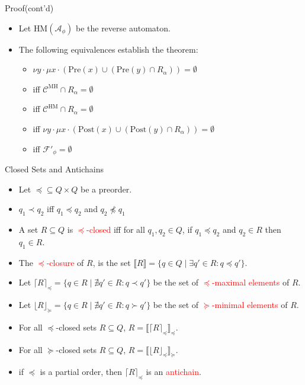 \documentclass[12pt]{beamer}
\begin{document}
\begin{frame}{Proof(cont'd)}
	\begin{itemize}
		\item Let $\text{HM}(\mathcal{A}_{\phi})$ be the reverse automaton.
		\item The following equivalences establish the theorem:
		\begin{itemize}
				\item $\nu y \cdot \mu x \cdot (\text{Pre}(x) \cup (\text{Pre}(y) \cap R_{\alpha})) = \emptyset$
				\item iff $\mathcal{C}^{\text{MH}} \cap R_{\alpha} = \emptyset$
				\item iff $\mathcal{C}^{\text{HM}} \cap R_{\alpha} = \emptyset$
				\item iff $\nu y \cdot \mu x \cdot (\text{Post}(x) \cup (\text{Post}(y) \cap R_{\alpha})) = \emptyset$
				\item iff $\mathcal{F}'_{\phi} = \emptyset$
		\end{itemize}
	\end{itemize}
\end{frame}

\begin{frame}{Closed Sets and Antichains}
	\begin{itemize}
		\item Let $\preceq \subseteq Q \times Q$ be a preorder.
		\item $q_{1} \prec q_{2}$ iff $q_{1} \preceq q_{2}$ and $q_{2} \npreceq q_{1}$
		\item A set $R \subseteq Q$ is \textcolor{red}{$\preceq$-closed} iff for all $q_{1}, q_{2} \in Q$, if $q_{1} \preceq q_{2}$ and $q_{2} \in R$ then $q_{1} \in R$.
		\item The \textcolor{red}{$\preceq$-closure} of $R$, is the set $\llbracket R \rrbracket = \{q \in Q \mid \exists q' \in R : q \preceq q'\}$.
		\item Let $\lceil R \rceil_{\preceq} = \{q \in R \mid \nexists q' \in R : q \prec q'\}$ be the set of \textcolor{red}{$\preceq$-maximal elements} of $R$.
		\item Let $\lfloor R \rfloor_{\succeq} = \{q \in R \mid \nexists q' \in R : q \succ q'\}$ be the set of \textcolor{red}{$\succeq$-minimal elements} of $R$.
		\item For all $\preceq$-closed sets $R \subseteq Q$, $R = \llbracket \lceil R \rceil_{\preceq} \rrbracket_{\preceq}$.
		\item For all $\succeq$-closed sets $R \subseteq Q$, $R = \llbracket \lfloor R \rfloor_{\preceq} \rrbracket_{\succeq}$.
		\item if $\preceq$ is a partial order, then $\lceil R \rceil_{\preceq}$ is an \textcolor{red}{antichain}.
	\end{itemize}
\end{frame}
\end{document}
